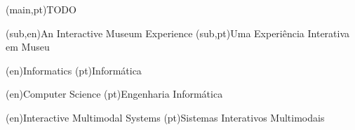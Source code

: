 \nttitle(main,pt){TODO}%

\nttitle(sub,en){An Interactive Museum Experience}%
\nttitle(sub,pt){Uma Experiência Interativa em Museu}%



%
%
%
%
\ntdepartment*(en){Informatics} %
\ntdepartment*(pt){Informática}   %



%
%
%
%
\ntdegreename*(en){Computer Science}          %
\ntdegreename*(pt){Engenharia Informática} %



%
%
%
%
\ntspecialization*(en){Interactive Multimodal Systems}         %
\ntspecialization*(pt){Sistemas Interativos Multimodais} %



